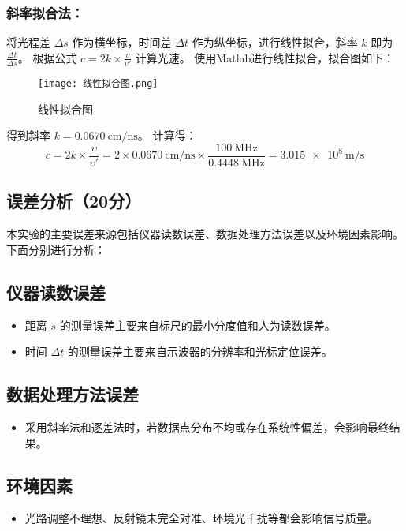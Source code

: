 \documentclass[]{../template/Report}%
\begin{document}
\subsubsection{斜率拟合法：}将光程差 $\Delta s$ 作为横坐标，时间差 $\Delta t$ 作为纵坐标，进行线性拟合，斜率 $k$ 即为 $\frac{\Delta t}{\Delta s}$。
根据公式 $c = 2k \times \frac{\upsilon}{\upsilon'}$ 计算光速。
使用Matlab进行线性拟合，拟合图如下：

\begin{figure}[H]
    \centering
    \texttt{[image: 线性拟合图.png]}
    \caption{线性拟合图}
    \label{fig:线性拟合图}
\end{figure}

得到斜率 $k = \SI{0.0670}{\centi\meter\per\nano\second}$。
计算得：
\begin{equation}
    c = 2k \times \frac{\upsilon}{\upsilon'} = 2 \times \SI{0.0670}{\centi\meter\per\nano\second} \times \frac{\SI{100}{\mega\hertz}}{\SI{0.4448}{\mega\hertz}} = \SI{3.015e8}{\meter\per\second}
\end{equation}

\newpage

\subsection{误差分析（20分）}
本实验的主要误差来源包括仪器读数误差、数据处理方法误差以及环境因素影响。下面分别进行分析：

\subsection{仪器读数误差}
\begin{itemize}
    \item 距离 $s$ 的测量误差主要来自标尺的最小分度值和人为读数误差。
    \item 时间 $\Delta t$ 的测量误差主要来自示波器的分辨率和光标定位误差。
\end{itemize}

\subsection{数据处理方法误差}
\begin{itemize}
    \item 采用斜率法和逐差法时，若数据点分布不均或存在系统性偏差，会影响最终结果。
\end{itemize}

\subsection{环境因素}
\begin{itemize}
    \item 光路调整不理想、反射镜未完全对准、环境光干扰等都会影响信号质量。
\end{itemize}
\end{document}

